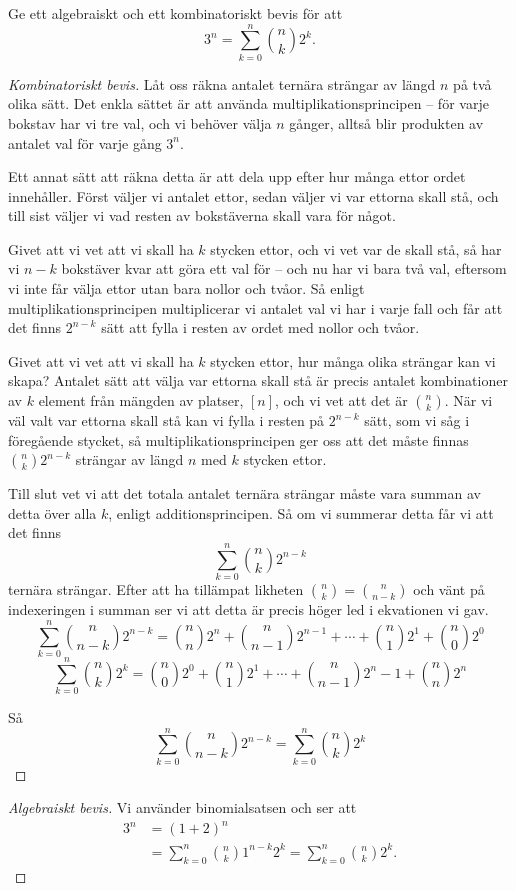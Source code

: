 \documentclass[nobib]{tufte-handout}
\begin{document}
\begin{example}
  Ge ett algebraiskt och ett kombinatoriskt bevis för att
  $$3^n = \sum_{k=0}^n \binom{n}{k}2^k.$$

  \begin{proof}[Kombinatoriskt bevis]
    Låt oss räkna antalet ternära strängar av längd $n$ på två olika sätt. Det enkla sättet är att använda multiplikationsprincipen -- för varje bokstav har vi tre val, och vi behöver välja $n$ gånger, alltså blir produkten av antalet val för varje gång $3^n$.

    Ett annat sätt att räkna detta är att dela upp efter hur många ettor ordet innehåller. Först väljer vi antalet ettor, sedan väljer vi var ettorna skall stå, och till sist väljer vi vad resten av bokstäverna skall vara för något.

    Givet att vi vet att vi skall ha $k$ stycken ettor, och vi vet var de skall stå, så har vi $n-k$ bokstäver kvar att göra ett val för -- och nu har vi bara två val, eftersom vi inte får välja ettor utan bara nollor och tvåor. Så enligt multiplikationsprincipen multiplicerar vi antalet val vi har i varje fall och får att det finns $2^{n-k}$ sätt att fylla i resten av ordet med nollor och tvåor.

    Givet att vi vet att vi skall ha $k$ stycken ettor, hur många olika strängar kan vi skapa? Antalet sätt att välja var ettorna skall stå är precis antalet kombinationer av $k$ element från mängden av platser, $[n]$, och vi vet att det är $\binom{n}{k}$. När vi väl valt var ettorna skall stå kan vi fylla i resten på $2^{n-k}$ sätt, som vi såg i föregående stycket, så multiplikationsprincipen ger oss att det måste finnas $\binom{n}{k}2^{n-k}$ strängar av längd $n$ med $k$ stycken ettor.

    Till slut vet vi att det totala antalet ternära strängar måste vara summan av detta över alla $k$, enligt additionsprincipen. Så om vi summerar detta får vi att det finns
    $$\sum_{k=0}^n \binom{n}{k}2^{n-k}$$
    ternära strängar. Efter att ha tillämpat likheten $\binom{n}{k} = \binom{n}{n-k}$ och vänt på indexeringen i summan ser vi att detta är precis höger led i ekvationen vi gav.
        $$\sum_{k=0}^n \binom{n}{n-k}2^{n-k}=\binom{n}{n}2^n+\binom{n}{n-1}2^{n-1}+\cdots+\binom{n}{1}2^1+\binom{n}{0}2^0$$
    $$\sum_{k=0}^n \binom{n}{k}2^k=\binom{n}{0}2^0+\binom{n}{1}2^{1}+\cdots+\binom{n}{n-1}2^n-1+\binom{n}{n}2^n$$

    Så 
    $$\sum_{k=0}^n \binom{n}{n-k}2^{n-k}=\sum_{k=0}^n \binom{n}{k}2^k$$
  \end{proof}

  \begin{proof}[Algebraiskt bevis]
    Vi använder binomialsatsen och ser att
    \begin{align*}
      3^n &= (1+2)^n\\
      &= \sum_{k=0}^n \binom{n}{k}1^{n-k}2^k = \sum_{k=0}^n \binom{n}{k}2^k.
    \end{align*}
  \end{proof}
\end{example}
\end{document}
